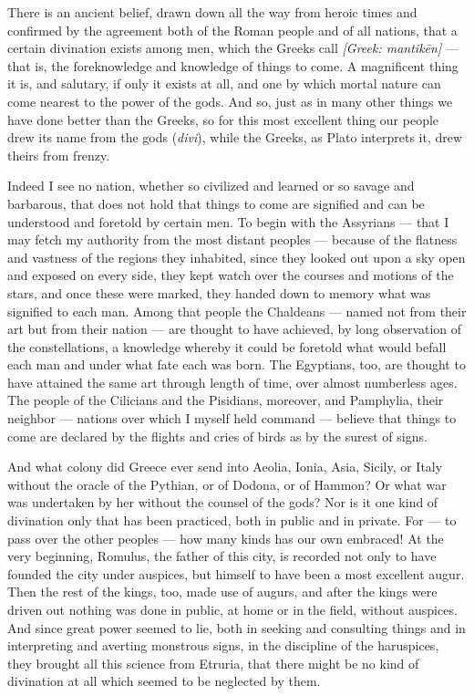 

 There is an ancient belief, drawn down all the way from heroic times and confirmed by the agreement both of the Roman people and of all nations, that a certain divination exists among men, which the Greeks call \textit{[Greek: mantikēn]} — that is, the foreknowledge and knowledge of things to come. A magnificent thing it is, and salutary, if only it exists at all, and one by which mortal nature can come nearest to the power of the gods. And so, just as in many other things we have done better than the Greeks, so for this most excellent thing our people drew its name from the gods (\textit{divi}), while the Greeks, as Plato interprets it, drew theirs from frenzy.

 Indeed I see no nation, whether so civilized and learned or so savage and barbarous, that does not hold that things to come are signified and can be understood and foretold by certain men. To begin with the Assyrians — that I may fetch my authority from the most distant peoples — because of the flatness and vastness of the regions they inhabited, since they looked out upon a sky open and exposed on every side, they kept watch over the courses and motions of the stars, and once these were marked, they handed down to memory what was signified to each man. Among that people the Chaldeans — named not from their art but from their nation — are thought to have achieved, by long observation of the constellations, a knowledge whereby it could be foretold what would befall each man and under what fate each was born. The Egyptians, too, are thought to have attained the same art through length of time, over almost numberless ages. The people of the Cilicians and the Pisidians, moreover, and Pamphylia, their neighbor — nations over which I myself held command — believe that things to come are declared by the flights and cries of birds as by the surest of signs.

 And what colony did Greece ever send into Aeolia, Ionia, Asia, Sicily, or Italy without the oracle of the Pythian, or of Dodona, or of Hammon? Or what war was undertaken by her without the counsel of the gods? Nor is it one kind of divination only that has been practiced, both in public and in private. For — to pass over the other peoples — how many kinds has our own embraced! At the very beginning, Romulus, the father of this city, is recorded not only to have founded the city under auspices, but himself to have been a most excellent augur. Then the rest of the kings, too, made use of augurs, and after the kings were driven out nothing was done in public, at home or in the field, without auspices. And since great power seemed to lie, both in seeking and consulting things and in interpreting and averting monstrous signs, in the discipline of the haruspices, they brought all this science from Etruria, that there might be no kind of divination at all which seemed to be neglected by them.

